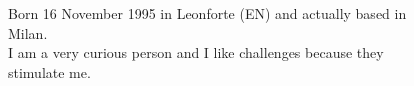 \documentclass[9pt]{developercv} %
\begin{document}
\vspace{0.5cm}



\begin{figure}[!htb]
    \centering
    \begin{minipage}{0.5\textwidth} %
    \vspace{0.3cm}
	\vspace{-\baselineskip} %
	
	Born 16 November 1995 in Leonforte (EN) and actually based in Milan.\\
	I am a very curious person and I like challenges because they stimulate me.\\
	

\end{minipage}
\hfill %
    \begin{minipage}{0.4\textwidth} %
\centering
{}
\end{minipage}
\end{figure}

\vspace{0.5cm}

\end{document}
